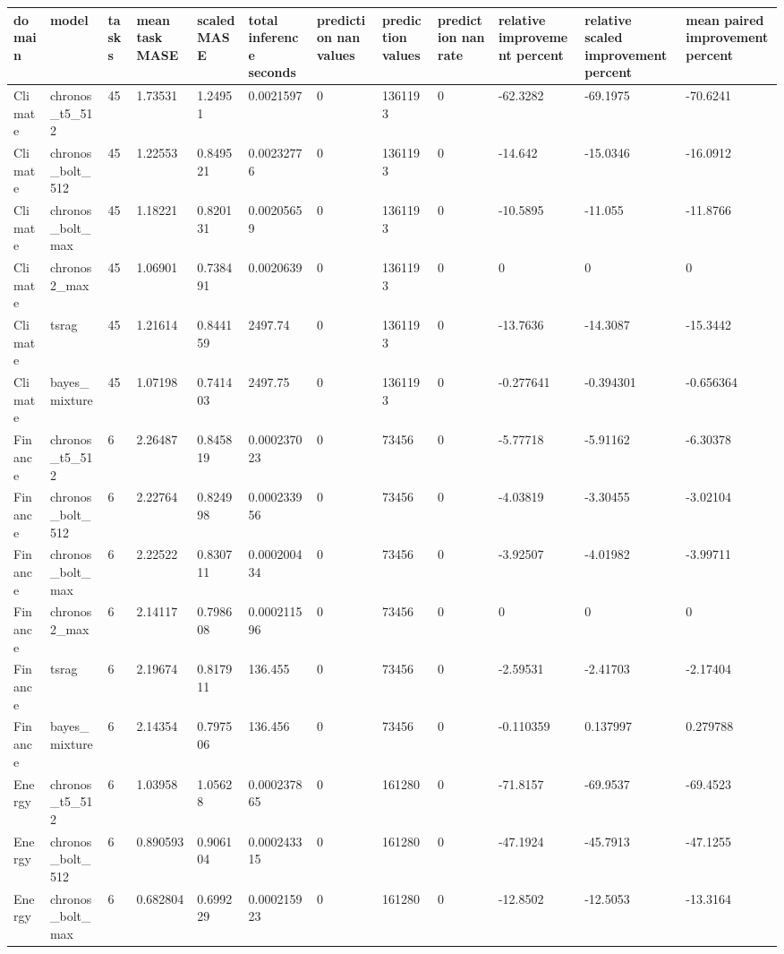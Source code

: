 \begin{tabular}{llllllllllll}
\toprule
domain & model & tasks & mean task MASE & scaled MASE & total inference seconds & prediction nan values & prediction values & prediction nan rate & relative improvement percent & relative scaled improvement percent & mean paired improvement percent \\
\midrule
Climate & chronos\_t5\_512 & 45 & 1.73531 & 1.24951 & 0.0021597 & 0 & 1361193 & 0 & -62.3282 & -69.1975 & -70.6241 \\
Climate & chronos\_bolt\_512 & 45 & 1.22553 & 0.849521 & 0.00232776 & 0 & 1361193 & 0 & -14.642 & -15.0346 & -16.0912 \\
Climate & chronos\_bolt\_max & 45 & 1.18221 & 0.820131 & 0.00205659 & 0 & 1361193 & 0 & -10.5895 & -11.055 & -11.8766 \\
Climate & chronos2\_max & 45 & 1.06901 & 0.738491 & 0.0020639 & 0 & 1361193 & 0 & 0 & 0 & 0 \\
Climate & tsrag & 45 & 1.21614 & 0.844159 & 2497.74 & 0 & 1361193 & 0 & -13.7636 & -14.3087 & -15.3442 \\
Climate & bayes\_mixture & 45 & 1.07198 & 0.741403 & 2497.75 & 0 & 1361193 & 0 & -0.277641 & -0.394301 & -0.656364 \\
Finance & chronos\_t5\_512 & 6 & 2.26487 & 0.845819 & 0.000237023 & 0 & 73456 & 0 & -5.77718 & -5.91162 & -6.30378 \\
Finance & chronos\_bolt\_512 & 6 & 2.22764 & 0.824998 & 0.000233956 & 0 & 73456 & 0 & -4.03819 & -3.30455 & -3.02104 \\
Finance & chronos\_bolt\_max & 6 & 2.22522 & 0.830711 & 0.000200434 & 0 & 73456 & 0 & -3.92507 & -4.01982 & -3.99711 \\
Finance & chronos2\_max & 6 & 2.14117 & 0.798608 & 0.000211596 & 0 & 73456 & 0 & 0 & 0 & 0 \\
Finance & tsrag & 6 & 2.19674 & 0.817911 & 136.455 & 0 & 73456 & 0 & -2.59531 & -2.41703 & -2.17404 \\
Finance & bayes\_mixture & 6 & 2.14354 & 0.797506 & 136.456 & 0 & 73456 & 0 & -0.110359 & 0.137997 & 0.279788 \\
Energy & chronos\_t5\_512 & 6 & 1.03958 & 1.05628 & 0.000237865 & 0 & 161280 & 0 & -71.8157 & -69.9537 & -69.4523 \\
Energy & chronos\_bolt\_512 & 6 & 0.890593 & 0.906104 & 0.000243315 & 0 & 161280 & 0 & -47.1924 & -45.7913 & -47.1255 \\
Energy & chronos\_bolt\_max & 6 & 0.682804 & 0.699229 & 0.000215923 & 0 & 161280 & 0 & -12.8502 & -12.5053 & -13.3164 \\

\end{tabular}
